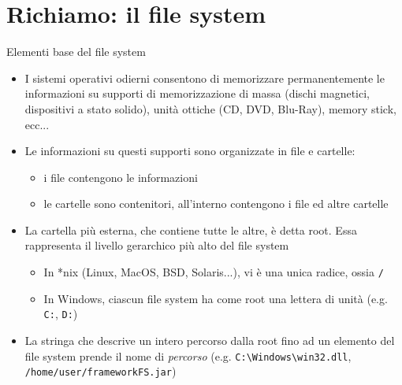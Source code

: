 \documentclass[presentation]{beamer}
\begin{document}
\section{Richiamo: il file system}
\begin{frame}{Elementi base del file system}
  \begin{itemize}
    \item I sistemi operativi odierni consentono di memorizzare permanentemente le informazioni su supporti di memorizzazione di massa (dischi magnetici, dispositivi a stato solido), unità ottiche (CD, DVD, Blu-Ray), memory stick, ecc...
    \item Le informazioni su questi supporti sono organizzate in file e cartelle:
      \begin{itemize}
        \item i file contengono le informazioni
        \item le cartelle sono contenitori, all'interno contengono i file ed altre cartelle
      \end{itemize}
    \item La cartella più esterna, che contiene tutte le altre, è detta root. Essa rappresenta il livello gerarchico più alto del file system
      \begin{itemize}
        \item In *nix (Linux, MacOS, BSD, Solaris...), vi è una unica radice, ossia \texttt{/}
        \item In Windows, ciascun file system ha come root una lettera di unità (e.g. \texttt{C:}, \texttt{D:})
      \end{itemize}
    \item La stringa che descrive un intero percorso dalla root fino ad un elemento del file system prende il nome di \emph{percorso} (e.g. \texttt{C:\textbackslash{}Windows\textbackslash{}win32.dll}, \texttt{/home/user/frameworkFS.jar})
  \end{itemize}
\end{frame}
\end{document}
